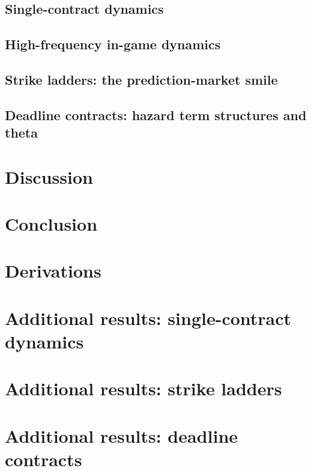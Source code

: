 \documentclass[11pt]{article}
\theoremstyle{definition}
\theoremstyle{remark}
\begin{document}
\subsection{Single-contract dynamics}\label{sec:res-dyn}

\subsection{High-frequency in-game dynamics}\label{sec:res-hf}

\subsection{Strike ladders: the prediction-market smile}\label{sec:res-lad}

\subsection{Deadline contracts: hazard term structures and theta}\label{sec:res-haz}


\section{Discussion}\label{sec:discussion}


\section{Conclusion}\label{sec:conclusion}





\appendix
\section{Derivations}\label{app:derivations}

\section{Additional results: single-contract dynamics}\label{app:dyn}

\section{Additional results: strike ladders}\label{app:lad}

\section{Additional results: deadline contracts}\label{app:haz}

\end{document}
